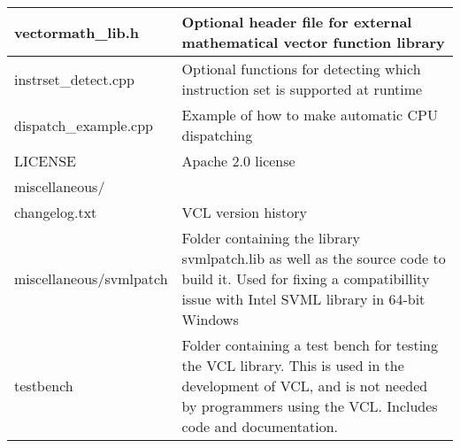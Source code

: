 \documentclass[vcl_manual.tex]{subfiles}
\begin{document}
\begin{longtable}[l]{|p{40mm}|p{100mm}|}
vectormath\_lib.h & Optional header file for external mathematical vector function library \\ \hline

instrset\_detect.cpp & Optional functions for detecting which instruction set is supported at runtime \\ \hline

dispatch\_example.cpp & Example of how to make automatic CPU dispatching \\ \hline

LICENSE & Apache 2.0 license \\ \hline

miscellaneous/\\changelog.txt & VCL version history \\ \hline

miscellaneous/svmlpatch & Folder containing the library svmlpatch.lib as well as the source code to build it. Used for fixing a compatibillity issue with Intel SVML library in 64-bit Windows \\ \hline

testbench & Folder containing a test bench for testing the VCL library. This is used in the development of VCL, and is not needed by programmers using the VCL. Includes code and documentation. \\ \hline

\end{longtable}
\end{document}
